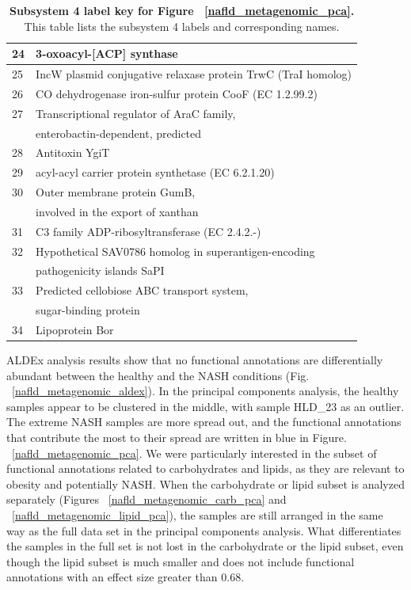 \begin{table}[!ht]
\begin{tabular}{|l|l|}
24 & 3-oxoacyl-[ACP] synthase \\ \hline
25 & IncW plasmid conjugative relaxase protein TrwC (TraI homolog) \\ \hline
26 & CO dehydrogenase iron-sulfur protein CooF (EC 1.2.99.2) \\ \hline
27 & Transcriptional regulator of AraC family, \\
& enterobactin-dependent, predicted \\ \hline
28 & Antitoxin YgiT \\ \hline
29 & acyl-acyl carrier protein synthetase (EC 6.2.1.20) \\ \hline
30 & Outer membrane protein GumB, \\
& involved in the export of xanthan \\ \hline
31 & C3 family ADP-ribosyltransferase (EC 2.4.2.-) \\ \hline
32 & Hypothetical SAV0786 homolog in superantigen-encoding \\
& pathogenicity islands SaPI \\ \hline
33 & Predicted cellobiose ABC transport system, \\
& sugar-binding protein \\ \hline
34 & Lipoprotein Bor \\ \hline
\end{tabular}
\caption[Subsystem 4 label key for Figure ~\ref{nafld_metagenomic_pca}.]{ \textbf{Subsystem 4 label key for Figure ~\ref{nafld_metagenomic_pca}.} This table lists the subsystem 4 labels and corresponding names.}
\label{nafld_subsys4_labels}
\end{table}

ALDEx analysis results show that no functional annotations are differentially abundant between the healthy and the NASH conditions (Fig. ~\ref{nafld_metagenomic_aldex}). In the principal components analysis, the healthy samples appear to be clustered in the middle, with sample HLD\_23 as an outlier. The extreme NASH samples are more spread out, and the functional annotations that contribute the most to their spread are written in blue in Figure. ~\ref{nafld_metagenomic_pca}. We were particularly interested in the subset of functional annotations related to carbohydrates and lipids, as they are relevant to obesity and potentially NASH. When the carbohydrate or lipid subset is analyzed separately (Figures ~\ref{nafld_metagenomic_carb_pca} and ~\ref{nafld_metagenomic_lipid_pca}), the samples are still arranged in the same way as the full data set in the principal components analysis. What differentiates the samples in the full set is not lost in the carbohydrate or the lipid subset, even though the lipid subset is much smaller and does not include functional annotations with an effect size greater than 0.68.

